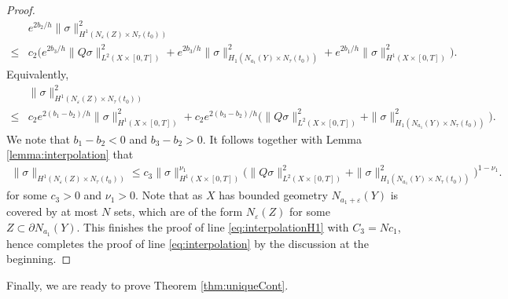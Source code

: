 \documentclass[12pt, reqno]{amsart}
\theoremstyle{plain}%
\theoremstyle{definition}
\theoremstyle{remark}
\numberwithin{equation}{section}
\begin{document}
\begin{proof}
	\begin{align*}
		&e^{2b_2/h}\|\sigma\|_{H^1(N_\varepsilon(Z)\times N_\tau(t_0))}^2\\ \leq& c_2\Big(e^{2b_3/h}\|Q\sigma\|^2_{L^2(X\times[0,T])}+e^{2b_3/h}\|\sigma\|^2_{H_1(N_{a_1}(Y)\times N_\tau(t_0))}+e^{2b_1/h}\|\sigma\|^2_{H^1(X\times[0,T])}\Big).
	\end{align*}
	Equivalently,
	\begin{align*}
		&\|\sigma\|_{H^1(N_\varepsilon(Z)\times N_\tau(t_0))}^2\\ \leq& c_2e^{2(b_1-b_2)/h}\|\sigma\|^2_{H^1(X\times[0,T])}+c_2e^{2(b_3-b_2)/h}\Big(\|Q\sigma\|^2_{L^2(X\times[0,T])}+\|\sigma\|^2_{H_1(N_{a_1}(Y)\times N_\tau(t_0))}\Big).
	\end{align*}
	We note that $b_1-b_2<0$ and $b_3-b_2>0$. It follows together with Lemma \ref{lemma:interpolation} that
	\begin{align*}
		\|\sigma\|_{H^1(N_\varepsilon(Z)\times N_\tau(t_0))}\leq c_3\|\sigma\|^{\nu_1}_{H^1(X\times[0,T])}\Big(\|Q\sigma\|^2_{L^2(X\times[0,T])}+\|\sigma\|^2_{H_1(N_{a_1}(Y)\times N_\tau(t_0))}\Big)^{1-\nu_1}.
	\end{align*}
	for some $c_3>0$ and $\nu_1>0$. Note that as $X$ has bounded geometry $N_{a_1+\varepsilon}(Y)$ is covered by at most $N$ sets, which are of the form $N_\varepsilon(Z)$ for some $Z\subset\partial N_{a_1}(Y)$. This finishes the proof of line \eqref{eq:interpolationH1} with $C_3=Nc_1$, hence completes the proof of line \eqref{eq:interpolation} by the discussion at the beginning.	
\end{proof}


Finally, we are ready to prove Theorem \ref{thm:uniqueCont}.
\end{document}
